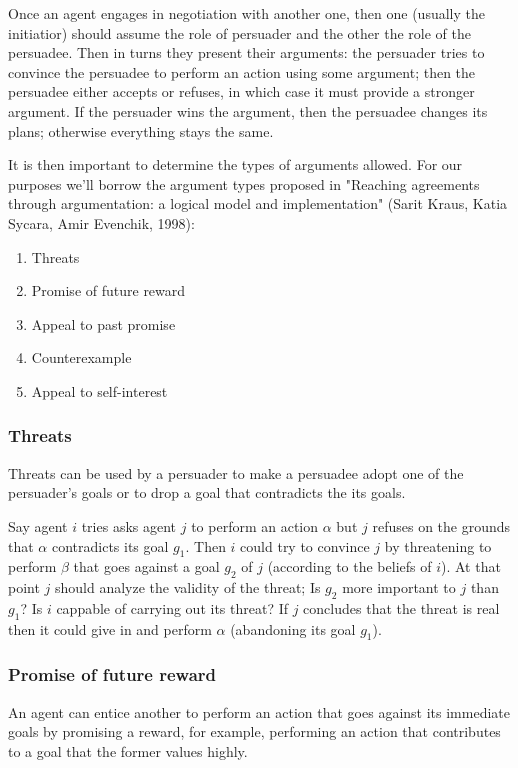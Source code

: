 \documentclass{article}
\begin{document}
Once an agent engages in negotiation with another one, then one (usually the initiatior) should assume the role of persuader and the other the role of the persuadee. Then in turns they present their arguments: the persuader tries to convince the persuadee to perform an action using some argument; then the persuadee either accepts or refuses, in which case it must provide a stronger argument. If the persuader wins the argument, then the persuadee changes its plans; otherwise everything stays the same.

It is then important to determine the types of arguments allowed. For our purposes we'll borrow the argument types proposed in "Reaching agreements through argumentation: a logical model and implementation" (Sarit Kraus, Katia Sycara, Amir Evenchik, 1998):
\begin{enumerate}
\item{Threats}
\item{Promise of future reward}
\item{Appeal to past promise}
\item{Counterexample}
\item{Appeal to self-interest}
\end{enumerate}

\subsubsection{Threats}
Threats can be used by a persuader to make a persuadee adopt one of the persuader's goals or to drop a goal that contradicts the its goals. 

Say agent $i$ tries asks agent $j$ to perform an action $\alpha$ but $j$ refuses on the grounds that $\alpha$ contradicts its goal $g_1$. Then $i$ could try to convince $j$ by threatening to perform $\beta$ that goes against a goal $g_2$ of $j$ (according to the beliefs of $i$). At that point $j$ should analyze the validity of the threat; Is $g_2$ more important to $j$ than $g_1$? Is $i$ cappable of carrying out its threat? If $j$ concludes that the threat is real then it could give in and perform $\alpha$ (abandoning its goal $g_1$).

\subsubsection{Promise of future reward}
An agent can entice another to perform an action that goes against its immediate goals by promising a reward, for example, performing an action that contributes to a goal that the former values highly. 
\end{document}
